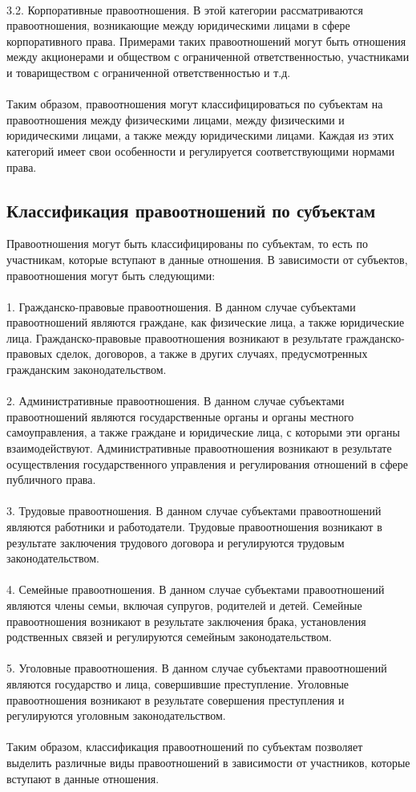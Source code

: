 \documentclass{article}
\begin{document}
~\\
3.2. Корпоративные правоотношения. В этой категории рассматриваются правоотношения, возникающие между юридическими лицами в сфере корпоративного права. Примерами таких правоотношений могут быть отношения между акционерами и обществом с ограниченной ответственностью, участниками и товариществом с ограниченной ответственностью и т.д.\\
~\\
Таким образом, правоотношения могут классифицироваться по субъектам на правоотношения между физическими лицами, между физическими и юридическими лицами, а также между юридическими лицами. Каждая из этих категорий имеет свои особенности и регулируется соответствующими нормами права.
\subsection{Классификация правоотношений по субъектам}
Правоотношения могут быть классифицированы по субъектам, то есть по участникам, которые вступают в данные отношения. В зависимости от субъектов, правоотношения могут быть следующими:\\
~\\
1. Гражданско-правовые правоотношения. В данном случае субъектами правоотношений являются граждане, как физические лица, а также юридические лица. Гражданско-правовые правоотношения возникают в результате гражданско-правовых сделок, договоров, а также в других случаях, предусмотренных гражданским законодательством.\\
~\\
2. Административные правоотношения. В данном случае субъектами правоотношений являются государственные органы и органы местного самоуправления, а также граждане и юридические лица, с которыми эти органы взаимодействуют. Административные правоотношения возникают в результате осуществления государственного управления и регулирования отношений в сфере публичного права.\\
~\\
3. Трудовые правоотношения. В данном случае субъектами правоотношений являются работники и работодатели. Трудовые правоотношения возникают в результате заключения трудового договора и регулируются трудовым законодательством.\\
~\\
4. Семейные правоотношения. В данном случае субъектами правоотношений являются члены семьи, включая супругов, родителей и детей. Семейные правоотношения возникают в результате заключения брака, установления родственных связей и регулируются семейным законодательством.\\
~\\
5. Уголовные правоотношения. В данном случае субъектами правоотношений являются государство и лица, совершившие преступление. Уголовные правоотношения возникают в результате совершения преступления и регулируются уголовным законодательством.\\
~\\
Таким образом, классификация правоотношений по субъектам позволяет выделить различные виды правоотношений в зависимости от участников, которые вступают в данные отношения.
\end{document}

